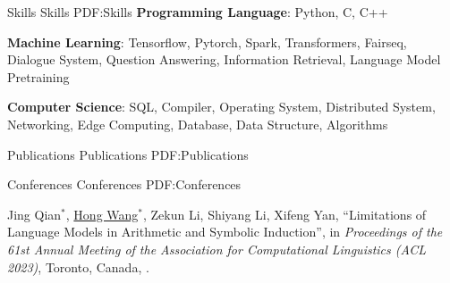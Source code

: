 \documentclass[letterpaper,MMMyyyy,nonstopmode]{simpleresumecv}
\begin{document}
\begin{Body}

\newpage
\Section
{Skills}
{Skills}
{PDF:Skills}
\BulletItem
\textbf{Programming Language}: Python, C, C++

\BulletItem
\textbf{Machine Learning}: Tensorflow, Pytorch, Spark, Transformers, Fairseq, 
Dialogue System, Question Answering, Information Retrieval, Language Model Pretraining

\BulletItem
\textbf{Computer Science}: SQL, Compiler, Operating System, Distributed System,
Networking, Edge Computing, Database, Data Structure, Algorithms


\Section
{Publications}
{Publications}
{PDF:Publications}






\BigGap
\SubSection
{Conferences}
{Conferences}
{PDF:Conferences}

\begin{enumerate}[label={[\arabic*]~~}]
\item
Jing Qian$^*$, \underline{Hong Wang}$^*$, Zekun Li, Shiyang Li, Xifeng Yan,
``Limitations of Language Models in Arithmetic and Symbolic Induction'',
in \textit{Proceedings of the 61st Annual Meeting of the Association for Computational Linguistics (ACL 2023)}, Toronto, Canada, 
.


\end{enumerate}
\end{Body}
\end{document}
